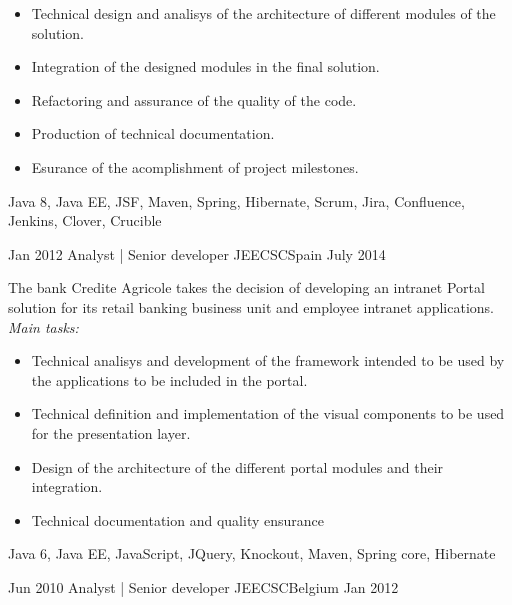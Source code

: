 \begin{experiences}
{                      \begin{itemize}
                        \item Technical design and analisys of the architecture of different modules of the solution.
                        \item Integration of the designed modules in the final solution.                
                        \item Refactoring and assurance of the quality of the code.
                        \item Production of technical documentation.
                        \item Esurance of the acomplishment of project milestones.
                      \end{itemize}
                    }
                    {Java 8, Java EE, JSF, Maven, Spring, Hibernate, Scrum, Jira, Confluence, Jenkins, Clover, Crucible}
                    
  \emptySeparator
  
    \experience
    {Jan 2012} {Analyst | Senior developer JEE}{CSC}{Spain}
    {July 2014}    {

The bank Credite Agricole takes the decision of developing an intranet Portal solution for its
retail banking business unit and employee intranet applications.
\\
\emph{Main tasks:}    	
                      \begin{itemize}
                        \item Technical analisys and development of the framework intended to be used by the applications to be included in the portal.
                        \item Technical definition and implementation of the visual components to be used for the presentation layer.                   
                        \item Design of the architecture of the different portal modules and their integration.
                        \item Technical documentation and quality ensurance
                      \end{itemize}
                    }
                    {Java 6, Java EE, JavaScript, JQuery, Knockout, Maven, Spring core, Hibernate}
                    
  \emptySeparator
  
  
  \experience
    {Jun 2010} {Analyst | Senior developer JEE}{CSC}{Belgium}
    {Jan 2012}    {

}
\end{experiences}
